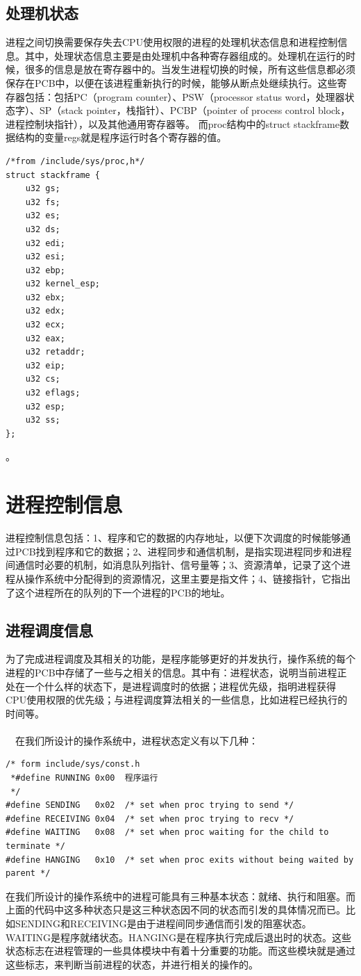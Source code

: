\documentclass[UTF8,nofonts,cs4size]{ctexrep}
\begin{document}
\subsection{处理机状态}
进程之间切换需要保存失去CPU使用权限的进程的处理机状态信息和进程控制信息。其中，处理状态信息主要是由处理机中各种寄存器组成的。处理机在运行的时候，很多的信息是放在寄存器中的。当发生进程切换的时候，所有这些信息都必须保存在PCB中，以便在该进程重新执行的时候，能够从断点处继续执行。这些寄存器包括：包括PC（program counter）、PSW（processor status word，处理器状态字）、SP（stack pointer，栈指针）、PCBP（pointer of process control block，进程控制块指针），以及其他通用寄存器等。
而proc结构中的struct stackframe数据结构的变量regs就是程序运行时各个寄存器的值。
\begin{lstlisting}
/*from /include/sys/proc,h*/
struct stackframe {	
	u32	gs;		
	u32	fs;		
	u32	es;		
	u32	ds;		
	u32	edi;		
	u32	esi;		
	u32	ebp;		
	u32	kernel_esp;	
	u32	ebx;			
	u32	edx;		
	u32	ecx;		
	u32	eax;		
	u32	retaddr;	
	u32	eip;		
	u32	cs;		
	u32	eflags;		
	u32	esp;		
	u32	ss;		
};
\end{lstlisting}。
\section{进程控制信息}
进程控制信息包括：1、程序和它的数据的内存地址，以便下次调度的时候能够通过PCB找到程序和它的数据；2、进程同步和通信机制，是指实现进程同步和进程间通信时必要的机制，如消息队列指针、信号量等；3、资源清单，记录了这个进程从操作系统中分配得到的资源情况，这里主要是指文件；4、链接指针，它指出了这个进程所在的队列的下一个进程的PCB的地址。
\subsection{进程调度信息}
为了完成进程调度及其相关的功能，是程序能够更好的并发执行，操作系统的每个进程的PCB中存储了一些与之相关的信息。其中有：进程状态，说明当前进程正处在一个什么样的状态下，是进程调度时的依据；进程优先级，指明进程获得CPU使用权限的优先级；与进程调度算法相关的一些信息，比如进程已经执行的时间等。
\paragraph{}
\indent \ \ 
在我们所设计的操作系统中，进程状态定义有以下几种：
\begin{lstlisting}
/* form include/sys/const.h
 *#define RUNNING 0x00  程序运行
 */
#define SENDING   0x02	/* set when proc trying to send */
#define RECEIVING 0x04	/* set when proc trying to recv */
#define WAITING   0x08	/* set when proc waiting for the child to terminate */
#define HANGING   0x10	/* set when proc exits without being waited by parent */
\end{lstlisting}
在我们所设计的操作系统中的进程可能具有三种基本状态：就绪、执行和阻塞。而上面的代码中这多种状态只是这三种状态因不同的状态而引发的具体情况而已。比如SENDING和RECEIVING是由于进程间同步通信而引发的阻塞状态。WAITING是程序就绪状态。HANGING是在程序执行完成后退出时的状态。这些状态标志在进程管理的一些具体模块中有着十分重要的功能。而这些模块就是通过这些标志，来判断当前进程的状态，并进行相关的操作的。
\end{document}
